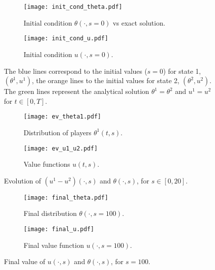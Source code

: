 \documentclass[12pt]{amsart}
\newcommand{\1}{{\chi}}
\theoremstyle{definition}
\begin{document}
    \begin{figure}
                         \centering
                        \begin{subfigure}{0.5\textwidth}
                                         \centering
                \texttt{[image: init\_cond\_theta.pdf]}
                \caption{Initial condition $\theta(\cdot,s=0)$ vs exact solution.}
               \label{fig:it_cond}
                        \end{subfigure}
            \begin{subfigure}{0.5\textwidth}
            \centering
                \texttt{[image: init\_cond\_u.pdf]}
                \caption{Initial condition $u(\cdot,s=0)$.}
            \end{subfigure}
                \caption{The blue lines correspond to the initial values ($s=0$) for state 1, $(\theta^1,u^1)$, the orange lines to the initial values for state 2, $(\theta^2,u^2)$.  
                                         The green lines represent the analytical solution $\theta^1=\theta^2$ and $u^1=u^2$ for $t\in [0,T]$.  
                                         }
        \label{AA1}
    \end{figure}
                \begin{figure}
        \centering
                        \begin{subfigure}{0.5\textwidth}
            \centering
                \texttt{[image: ev\_theta1.pdf]}
                \caption{Distribution of players $\theta^1(t,s)$.}
               \label{fig:AA2:theta}
                        \end{subfigure}
            \begin{subfigure}{0.5\textwidth}
            \centering
                \texttt{[image: ev\_u1\_u2.pdf]}
                \caption{Value functions $u(t,s)$.}
            \end{subfigure}
        \caption{Evolution of $(u^1-u^2)(\cdot,s)$ and $\theta(\cdot,s)$, for $s\in[0,20]$.}
        \label{AA2}
        \end{figure}
                \begin{figure}
        \centering
                        \begin{subfigure}{0.5\textwidth}
            \centering
                \texttt{[image: final\_theta.pdf]}
                \caption{Final distribution $\theta(\cdot,s=100)$.}
                        \end{subfigure}
            \begin{subfigure}{0.5\textwidth}
            \centering
                \texttt{[image: final\_u.pdf]}
                \caption{Final value function $u(\cdot,s=100)$.}
            \end{subfigure}
        \caption{Final value of $u(\cdot,s)$ and $\theta(\cdot,s)$, for $s=100$.}
        \label{AA3}
        \end{figure}
\end{document}
